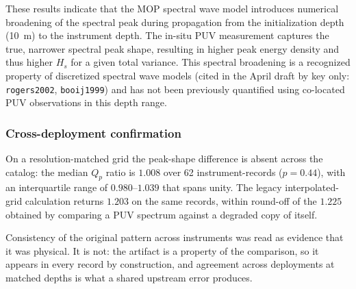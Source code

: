 These results indicate that the MOP spectral wave model introduces
numerical broadening of the spectral peak during propagation from the
initialization depth (\SI{10}{\meter}) to the instrument depth. The
in-situ PUV measurement captures the true, narrower spectral peak shape,
resulting in higher peak energy density and thus higher $H_s$ for a
given total variance. This spectral broadening is a recognized property
of discretized spectral wave models (cited in the April draft by key only: \texttt{rogers2002}, \texttt{booij1999})
and has not been previously quantified using co-located PUV observations
in this depth range.

\subsubsection{Cross-deployment confirmation}



On a resolution-matched grid the peak-shape difference is absent across the
catalog: the median $Q_p$ ratio is $1.008$ over 62 instrument-records
($p = 0.44$), with an interquartile range of $0.980$--$1.039$ that spans unity.
The legacy interpolated-grid calculation returns $1.203$ on the same records,
within round-off of the $1.225$ obtained by comparing a PUV spectrum against a
degraded copy of itself.

Consistency of the original pattern across instruments was read as evidence that
it was physical. It is not: the artifact is a property of the comparison, so it
appears in every record by construction, and agreement across deployments at
matched depths is what a shared upstream error produces.

